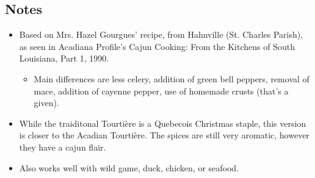 \begin{multicols}{2}
\subsection*{Notes}
\begin{itemize}
    \item Based on Mrs. Hazel Gourgues' recipe, from Hahnville (St. Charles Parish), as seen in Acadiana Profile’s Cajun Cooking: From the Kitchens of South Louisiana, Part 1, 1990.
    \begin{itemize}
        \item Main differences are less celery, addition of green bell peppers, removal of mace, addition of cayenne pepper, use of homemade crusts (that's a given).
    \end{itemize}
    \item While the traiditonal Tourtière is a Quebecois Christmas staple, this version is closer to the Acadian Tourtière. The spices are still very aromatic, however they have a cajun flair.
    \item Also works well with wild game, duck, chicken, or seafood.
\end{itemize}
\end{multicols}
\clearpage